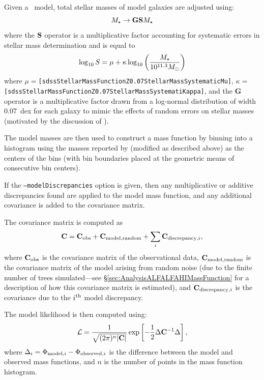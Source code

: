 Given a \glc\ model, total stellar masses of model galaxies are adjusted using:
\begin{equation}
 M_\star \rightarrow {\bf G} {\bf S} M_\star 
\end{equation}
where the ${\bf S}$ operator is a multiplicative factor accounting for systematic errors in stellar mass determination and is equal to \citep{behroozi_comprehensive_2010}
\begin{equation}
 \log_{\rm 10} S = \mu + \kappa \log_{\rm 10} \left({M_\star \over 10^{11.3}M_\odot}\right)
\end{equation}
where $\mu=${\tt [sdssStellarMassFunctionZ0.07StellarMassSystematicMu]}, $\kappa=${\tt [sdssStellarMassFunctionZ0.07StellarMassSystematiKappa]}, and the {\bf G} operator is a multiplicative factor drawn from a log-normal distribution of width $0.07$~dex for each galaxy to mimic the effects of random errors on stellar masses (motivated by the discussion of \cite{behroozi_comprehensive_2010}).

The model masses are then used to construct a mass function by binning into a histogram using the masses reported by \cite{li_distribution_2009} (modified as described above) as the centers of the bins (with bin boundaries placed at the geometric means of consecutive bin centers).

If the {\tt --modelDiscrepancies} option is given, then any multiplicative or additive discrepancies found are applied to the model mass function, and any additional covariance is added to the covariance matrix.

The covariance matrix is computed as
\begin{equation}
 {\bf C} = {\bf C}_{\rm obs} + {\bf C}_{\rm model,random} + \sum_i {\bf C}_{{\rm discrepancy}, i},
\end{equation}
where ${\bf C}_{\rm obs}$ is the covariance matrix of the observational data, ${\bf C}_{\rm model,random}$ is the covariance matrix of the model arising from random noise (due to the finite number of trees simulated---see \S\ref{sec:AnalysisALFALFAHIMassFunction} for a description of how this covariance matrix is estimated), and ${\bf C}_{{\rm discrepancy}, i}$ is the covariance due to the $i^{\rm th}$ model discrepancy.

The model likelihood is then computed using:
\begin{equation}
 \mathcal{L} = {1 \over \sqrt{(2 \pi)^n |{\bf C}|}} \exp\left[ -{1\over 2} \Delta {\bf C}^{-1} \Delta \right],
\end{equation}
where $\Delta_i = \Phi_{{\rm model}, i} - \Phi_{{\rm observed}, i}$ is the difference between the model and observed mass functions, and $n$ is the number of points in the mass function histogram.

